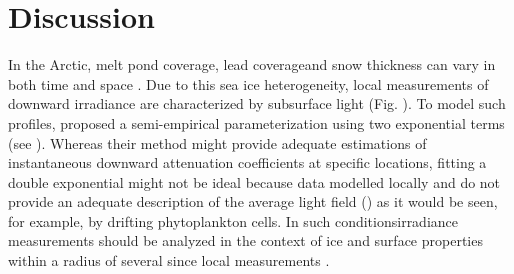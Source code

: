 \section{Discussion}

In the Arctic, melt pond coverage, lead coverage\DIFaddbegin {}\DIFaddend and \DIFdelbegin {}\DIFdelend snow thickness can vary \DIFdelbegin {}\DIFdelend \DIFaddbegin {}\DIFaddend in both time and space \DIFdelbegin {}\DIFdelend \DIFaddbegin {}\DIFaddend . Due to this sea ice heterogeneity, local \DIFdelbegin {}\DIFdelend \DIFaddbegin {}\DIFaddend measurements of downward irradiance are \DIFdelbegin {}\DIFdelend \DIFaddbegin {}\DIFaddend characterized by subsurface light \DIFdelbegin {}\DIFdelend \DIFaddbegin {}\DIFaddend (Fig. \DIFdelbegin {}\DIFdelend \DIFaddbegin {}\DIFaddend ). To model such profiles, \citet{Laney2017} proposed a semi-empirical parameterization using two exponential terms (see \DIFdelbegin {}\DIFdelend \DIFaddbegin {}). Whereas their method might provide adequate estimations of instantaneous downward \DIFaddbegin {}\DIFaddend attenuation coefficients at specific locations, fitting a double exponential might not be ideal because data \DIFdelbegin {}\DIFdelend \DIFaddbegin {}\DIFaddend modelled locally and do not provide an adequate description of the average light field (\meanedz{}) as it would be seen, for example, by drifting phytoplankton cells. In such conditions\DIFdelbegin {}\DIFdelend \DIFaddbegin {}\DIFaddend irradiance measurements should be analyzed in the context of ice and surface properties within a radius of several \DIFdelbegin {}\DIFdelend \DIFaddbegin {}\DIFaddend since local measurements \DIFdelbegin {}\DIFdelend \DIFaddbegin {}\DIFaddend .

